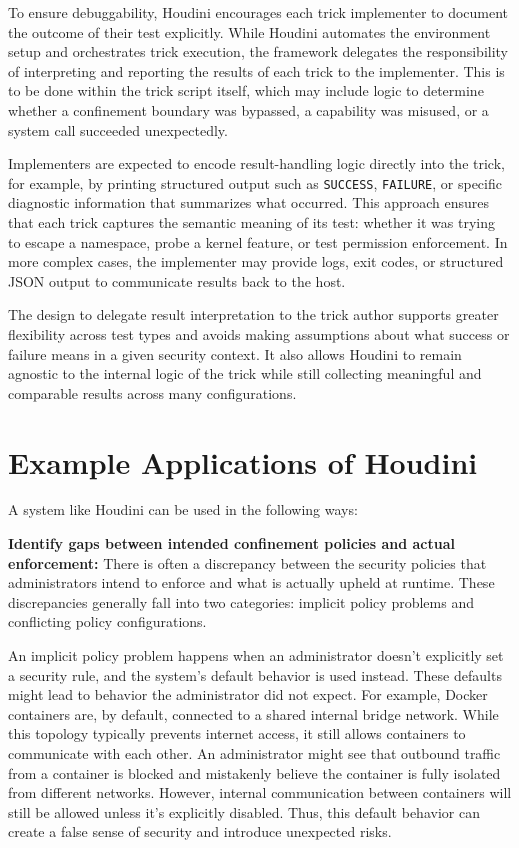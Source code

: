 \documentclass[12pt]{report}
\begin{document}
\begin{doublespace}
To ensure debuggability, Houdini encourages each trick implementer to document the outcome of their test explicitly. While Houdini automates the environment setup and orchestrates trick execution, the framework delegates the responsibility of interpreting and reporting the results of each trick to the implementer. This is to be done within the trick script itself, which may include logic to determine whether a confinement boundary was bypassed, a capability was misused, or a system call succeeded unexpectedly.

Implementers are expected to encode result-handling logic directly into the trick, for example, by printing structured output such as \texttt{SUCCESS}, \texttt{FAILURE}, or specific diagnostic information that summarizes what occurred. This approach ensures that each trick captures the semantic meaning of its test: whether it was trying to escape a namespace, probe a kernel feature, or test permission enforcement. In more complex cases, the implementer may provide logs, exit codes, or structured JSON output to communicate results back to the host.

The design to delegate result interpretation to the trick author supports greater flexibility across test types and avoids making assumptions about what success or failure means in a given security context. It also allows Houdini to remain agnostic to the internal logic of the trick while still collecting meaningful and comparable results across many configurations. 

\section{Example Applications of Houdini}
A system like Houdini can be used in the following ways: 

\noindent\textbf{Identify gaps between intended confinement policies and actual enforcement:}
There is often a discrepancy between the security policies that administrators intend to enforce and what is actually upheld at runtime. These discrepancies generally fall into two categories: implicit policy problems and conflicting policy configurations.

An implicit policy problem happens when an administrator doesn't explicitly set a security rule, and the system's default behavior is used instead. These defaults might lead to behavior the administrator did not expect. For example, Docker containers are, by default, connected to a shared internal bridge network. While this topology typically prevents internet access, it still allows containers to communicate with each other. An administrator might see that outbound traffic from a container is blocked and mistakenly believe the container is fully isolated from different networks. However, internal communication between containers will still be allowed unless it's explicitly disabled. Thus, this default behavior can create a false sense of security and introduce unexpected risks.


\end{doublespace}
\end{document}
